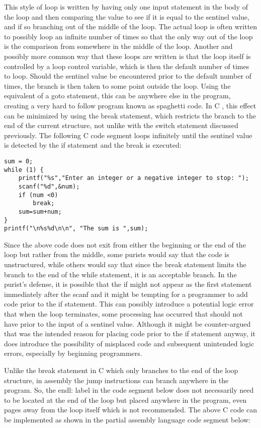 \documentclass[10pt]{article}
\begin{document}
This style of loop is written by having only one input statement in the body of the loop and then comparing the value to see if it is equal to the sentinel value, and if so branching out of the middle of the loop. The actual loop is often written to possibly loop an infinite number of times so that the only way out of the loop is the comparison from somewhere in the middle of the loop. Another and possibly more common way that these loops are written is that the loop itself is controlled by a loop control variable, which is then the default number of times to loop. Should the sentinel value be encountered prior to the default number of times, the branch is then taken to some point outside the loop. Using the equivalent of a goto statement, this can be anywhere else in the program, creating a very hard to follow program known as spaghetti code. In C , this effect can be minimized by using the break statement, which restricts the branch to the end of the current structure, not unlike with the switch statement discussed previously. The following C code segment loops infinitely until the sentinel value is detected by the if statement and the break is executed:

\begin{verbatim}
sum = 0;
while (1) {
    printf("%s","Enter an integer or a negative integer to stop: ");
    scanf("%d",&num);
    if (num <0)
        break;
    sum=sum+num;
}
printf("\n%s%d\n\n", "The sum is ",sum);
\end{verbatim}

Since the above code does not exit from either the beginning or the end of the loop but rather from the middle, some purists would say that the code is unstructured, while others would say that since the break statement limits the branch to the end of the while statement, it is an acceptable branch. In the purist's defense, it is possible that the if might not appear as the first statement immediately after the scanf and it might be tempting for a programmer to add code prior to the if statement. This can possibly introduce a potential logic error that when the loop terminates, some processing has occurred that should not have prior to the input of a sentinel value. Although it might be counter-argued that was the intended reason for placing code prior to the if statement anyway, it does introduce the possibility of misplaced code and subsequent unintended logic errors, especially by beginning programmers.

Unlike the break statement in C which only branches to the end of the loop structure, in assembly the jump instructions can branch anywhere in the program. So, the endl: label in the code segment below does not necessarily need to be located at the end of the loop but placed anywhere in the program, even pages away from the loop itself which is not recommended. The above C code can be implemented as shown in the partial assembly language code segment below:
\end{document}
